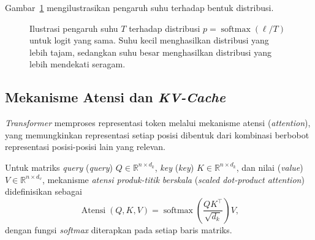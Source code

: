 Gambar~\ref{fig:softmax} mengilustrasikan pengaruh suhu terhadap
bentuk distribusi.

\begin{figure}[H]
\centering
{}
\caption{Ilustrasi pengaruh suhu $T$ terhadap distribusi
$p=\operatorname{softmax}(\ell/T)$ untuk logit yang sama.
Suhu kecil menghasilkan distribusi yang lebih tajam, sedangkan
suhu besar menghasilkan distribusi yang lebih mendekati seragam.}
\label{fig:softmax}
\end{figure}




\subsection{Mekanisme Atensi dan \textit{KV-Cache}}
\label{subsec:atensi}

\textit{Transformer} memproses representasi token melalui mekanisme
atensi (\textit{attention}), yang memungkinkan representasi setiap
posisi dibentuk dari kombinasi berbobot representasi posisi-posisi
lain yang relevan.

\begin{definisi}
\label{def:atensi}
Untuk matriks \textit{query} (\textit{query}) $Q\in\mathbb{R}^{n\times d_k}$,
\textit{key} (\textit{key}) $K\in\mathbb{R}^{n\times d_k}$, dan nilai
(\textit{value}) $V\in\mathbb{R}^{n\times d_v}$, mekanisme
\textit{atensi produk-titik berskala} (\textit{scaled dot-product
attention}) didefinisikan sebagai
\begin{equation}
\operatorname{Atensi}(Q,K,V)
=
\operatorname{softmax}
\left(\frac{QK^\top}{\sqrt{d_k}}\right)V,
\label{eq:atensi}
\end{equation}
dengan fungsi \textit{softmax} diterapkan pada setiap baris matriks.
\end{definisi}


